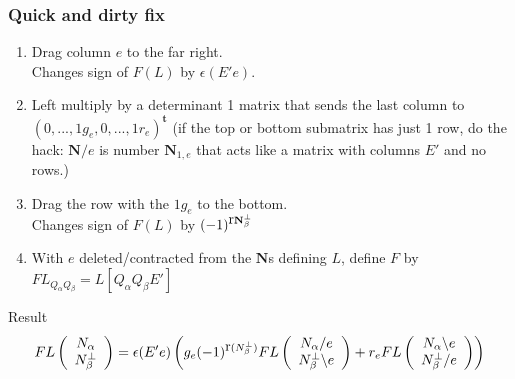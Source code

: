 \documentclass{beamer}
\newcommand{\rank}{{\mbox{r}}}%
\begin{document}
\begin{frame}
  \frametitle{Quick and dirty fix}
  \begin{enumerate}
  \item Drag column $e$ to the far right.\\
    Changes sign of $F(L)$ by $\epsilon(E'e)$.
  \item Left multiply by a determinant 1 matrix that sends the last column
    to $(0,...,1g_e,0,...,1r_e)^{\mathbf{t}}$ (if the top or bottom submatrix has just 1 row,
    do the hack: $\mathbf{N}/e$ is number $\mathbf{N}_{1,e}$ that acts like a matrix with
    columns $E'$ and no rows.)
  \item Drag the row with the $1g_e$ to the bottom.\\
    Changes sign of $F(L)$ by $(-1)^{\rank{\mathbf{\NbePe}}}$
  \item With $e$ deleted/contracted from the $\mathbf{N}$s defining $L$, define $F$ by
    $FL_{Q_\alpha Q_\beta} = L[Q_\alpha Q_\beta E']$
  \end{enumerate}
  \begin{block}{Result}
    \[
    FL\left( \begin{array}{cc} \Nal \\ \NbePe \end{array} \right)
    =
    \epsilon(E'e)\left(
    g_e (-1)^{\rank(\NbePe)}FL \left( \begin{array}{cc} \Nal/e \\ \NbePe\backslash e \end{array} \right)  +
    r_e FL \left( \begin{array}{cc} \Nal\backslash e \\ \NbePe/e \end{array} \right) \right)
    \]
  \end{block}
\end{frame}
\end{document}
